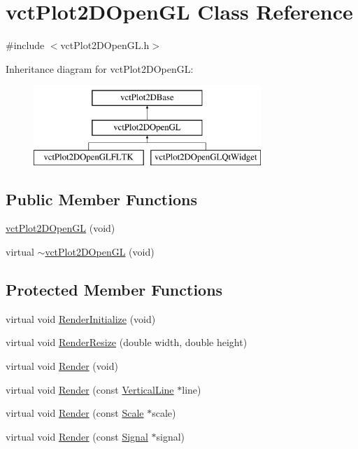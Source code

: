\hypertarget{classvct_plot2_d_open_g_l}{}\section{vct\+Plot2\+D\+Open\+G\+L Class Reference}
\label{classvct_plot2_d_open_g_l}


{\ttfamily \#include $<$vct\+Plot2\+D\+Open\+G\+L.\+h$>$}

Inheritance diagram for vct\+Plot2\+D\+Open\+G\+L\+:\begin{figure}[H]
\begin{center}
\leavevmode
\includegraphics[height=3.000000cm]{d5/d42/classvct_plot2_d_open_g_l}
\end{center}
\end{figure}
\subsection*{Public Member Functions}
\begin{DoxyCompactItemize}
\item 
\hyperlink{classvct_plot2_d_open_g_l_a627a06f03f3e076b2f72964ec5bc6adc}{vct\+Plot2\+D\+Open\+G\+L} (void)
\item 
virtual \hyperlink{classvct_plot2_d_open_g_l_a2dc44eb8eda48d9959948255f8d09aeb}{$\sim$vct\+Plot2\+D\+Open\+G\+L} (void)
\end{DoxyCompactItemize}
\subsection*{Protected Member Functions}
{\bf }\par
\begin{DoxyCompactItemize}
\item 
virtual void \hyperlink{classvct_plot2_d_open_g_l_a5e0d758ad4a3506e658d6e01058898a4}{Render\+Initialize} (void)
\item 
virtual void \hyperlink{classvct_plot2_d_open_g_l_a8bfbfcd31901fb734aa87ab40f06b937}{Render\+Resize} (double width, double height)
\item 
virtual void \hyperlink{classvct_plot2_d_open_g_l_a5629e5b685cf44aae8e863966f7ca412}{Render} (void)
\item 
virtual void \hyperlink{classvct_plot2_d_open_g_l_ac8bd8a94389c5524bf36d607d067edce}{Render} (const \hyperlink{classvct_plot2_d_base_1_1_vertical_line}{Vertical\+Line} $\ast$line)
\item 
virtual void \hyperlink{classvct_plot2_d_open_g_l_aa76055d15902aa5c35e9720d167eeab8}{Render} (const \hyperlink{classvct_plot2_d_base_1_1_scale}{Scale} $\ast$scale)
\item 
virtual void \hyperlink{classvct_plot2_d_open_g_l_a951848e293eabef82646de9554ba0892}{Render} (const \hyperlink{classvct_plot2_d_base_1_1_signal}{Signal} $\ast$signal)
\end{DoxyCompactItemize}

